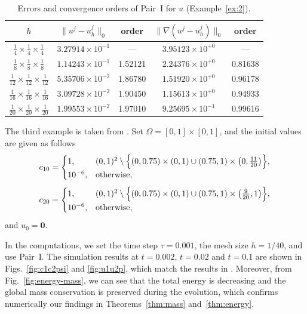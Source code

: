 \begin{table}[htbp]
\centering
\caption{Errors and convergence orders of Pair~I for $u$ (Example~\ref{ex:2}).}
\label{tab:3d-u}
\begin{tabular}{ccccc}
\hline
$h$ &
$\|u^{j} - u_{h}^{j}\|_{0}$ & order &
$\|\nabla(u^{j} - u_{h}^{j})\|_{0}$ & order \\
\hline
$\tfrac{1}{4}  \times \tfrac{1}{4}  \times \tfrac{1}{4}$  & $3.27914\times10^{-1}$ & ---     & $3.95123\times10^{+0}$ & ---     \\
$\tfrac{1}{8}  \times \tfrac{1}{8}  \times \tfrac{1}{8}$  & $1.14243\times10^{-1}$ & 1.52121 & $2.24376\times10^{+0}$ & 0.81638 \\
$\tfrac{1}{12} \times \tfrac{1}{12} \times \tfrac{1}{12}$ & $5.35706\times10^{-2}$ & 1.86780 & $1.51920\times10^{+0}$ & 0.96178 \\
$\tfrac{1}{16} \times \tfrac{1}{16} \times \tfrac{1}{16}$ & $3.09728\times10^{-2}$ & 1.90450 & $1.15613\times10^{+0}$ & 0.94933 \\
$\tfrac{1}{20} \times \tfrac{1}{20} \times \tfrac{1}{20}$ & $1.99553\times10^{-2}$ & 1.97010 & $9.25695\times10^{-1}$ & 0.99616 \\
\hline
\end{tabular}
\end{table}

\begin{example}
\label{ex:3}
The third example is taken from \cite{Prohl2009,Gao2017,DehghanGharibi2023}. Set
$\Omega = [0,1]\times[0,1]$, and the initial values are given as follows
\begin{equation}
  c_{10} =
  \begin{cases}
    1, & (0,1)^{2}\setminus
         \Bigl\{(0,0.75)\times(0,1)
               \cup (0.75,1)\times\bigl(0,\tfrac{11}{20}\bigr)\Bigr\}, \\
    10^{-6}, & \text{otherwise},
  \end{cases}
  \label{eq:ex3-c10}
\end{equation}
\begin{equation}
  c_{20} =
  \begin{cases}
    1, & (0,1)^{2}\setminus
         \Bigl\{(0,0.75)\times(0,1)
               \cup (0.75,1)\times\bigl(\tfrac{9}{20},1\bigr)\Bigr\}, \\
    10^{-6}, & \text{otherwise},
  \end{cases}
  \label{eq:ex3-c20}
\end{equation}
and $u_{0} = \mathbf{0}$.

In the computations, we set the time step $\tau = 0.001$, the mesh size $h = 1/40$, and use
Pair~I. The simulation results at $t = 0.002$, $t = 0.02$ and $t = 0.1$ are shown in
Figs.~\ref{fig:c1c2psi} and \ref{fig:u1u2p}, which match the results in
\cite{Prohl2009,Gao2017,DehghanGharibi2023}. Moreover, from Fig.~\ref{fig:energy-mass}, we
can see that the total energy is decreasing and the global mass conservation is preserved
during the evolution, which confirms numerically our findings in
Theorems~\ref{thm:mass} and~\ref{thm:energy}.
\end{example}

